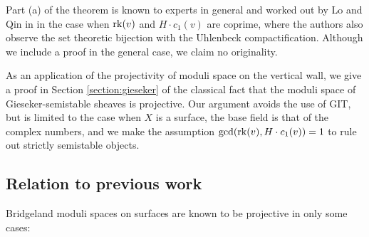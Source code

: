 Part (a) of the theorem is known to experts in general and worked out by Lo and Qin in \cite{LQ} in the case when $\operatorname{\mathrm{rk}}(v)$ and $H \cdot c_1(v)$ are coprime, where the authors also observe the set theoretic bijection with the Uhlenbeck compactification. Although we include a proof in the general case, we claim no originality.

As an application of the projectivity of moduli space on the vertical wall, we give a proof in Section \ref{section:gieseker} of the classical fact that the moduli space of Gieseker-semistable sheaves is projective. Our argument avoids the use of GIT, but is limited to the case when $X$ is a surface, the base field is that of the complex numbers, and we make the assumption $\gcd(\operatorname{\mathrm{rk}}(v), H \cdot c_1(v)) = 1$ to rule out strictly semistable objects.

\subsection*{Relation to previous work}
Bridgeland moduli spaces on surfaces are known to be projective in only some cases:

